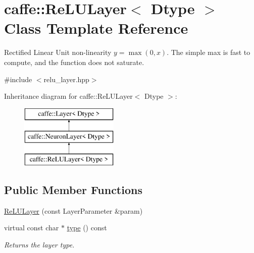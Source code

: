 \hypertarget{classcaffe_1_1ReLULayer}{}\section{caffe\+:\+:Re\+L\+U\+Layer$<$ Dtype $>$ Class Template Reference}
\label{classcaffe_1_1ReLULayer}


Rectified Linear Unit non-\/linearity $ y = \max(0, x) $. The simple max is fast to compute, and the function does not saturate.  




{\ttfamily \#include $<$relu\+\_\+layer.\+hpp$>$}

Inheritance diagram for caffe\+:\+:Re\+L\+U\+Layer$<$ Dtype $>$\+:\begin{figure}[H]
\begin{center}
\leavevmode
\includegraphics[height=3.000000cm]{classcaffe_1_1ReLULayer}
\end{center}
\end{figure}
\subsection*{Public Member Functions}
\begin{DoxyCompactItemize}
\item 
\hyperlink{classcaffe_1_1ReLULayer_aa6770fbbfd5e6f564c2ca19de7f7e712}{Re\+L\+U\+Layer} (const Layer\+Parameter \&param)
\item 
virtual const char $\ast$ \hyperlink{classcaffe_1_1ReLULayer_a80f429ddb1942f7c5e3d6530c69f9308}{type} () const \hypertarget{classcaffe_1_1ReLULayer_a80f429ddb1942f7c5e3d6530c69f9308}{}\label{classcaffe_1_1ReLULayer_a80f429ddb1942f7c5e3d6530c69f9308}

\begin{DoxyCompactList}\small\item\em Returns the layer type. \end{DoxyCompactList}\end{DoxyCompactItemize}
